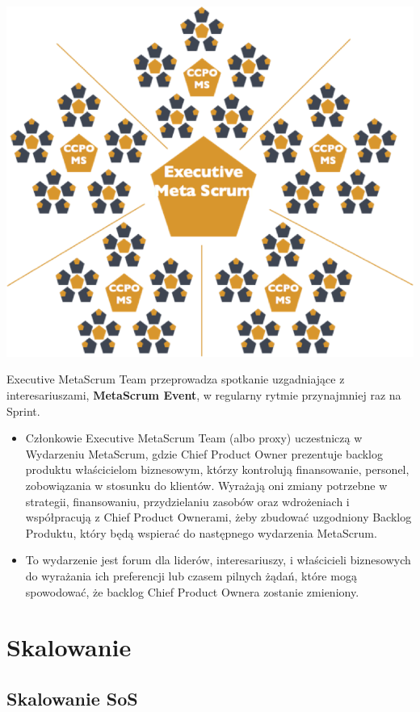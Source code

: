 \documentclass[12pt,a4paper,parskip=full]{scrartcl}
\begin{document}
\includegraphics[width=1.0\linewidth]{ExecMetaScrum.png}

Executive MetaScrum Team przeprowadza spotkanie uzgadniające z interesariuszami, \textbf{MetaScrum Event}, w regularny rytmie przynajmniej raz na Sprint.

\begin{itemize}
	\item Członkowie Executive MetaScrum Team (albo proxy) uczestniczą w Wydarzeniu MetaScrum, gdzie Chief Product Owner prezentuje backlog produktu właścicielom biznesowym, którzy kontrolują finansowanie, personel, zobowiązania w stosunku do klientów. Wyrażają oni zmiany potrzebne w strategii, finansowaniu, przydzielaniu zasobów oraz wdrożeniach i współpracują z Chief Product Ownerami, żeby zbudować uzgodniony Backlog Produktu, który będą wspierać do następnego wydarzenia MetaScrum.
	\item To wydarzenie jest forum dla  liderów, interesariuszy, i właścicieli biznesowych do wyrażania ich preferencji lub czasem pilnych żądań, które mogą spowodować, że backlog Chief Product Ownera zostanie zmieniony.
\end{itemize}

\section{Skalowanie}

\subsection{Skalowanie SoS}
\end{document}
